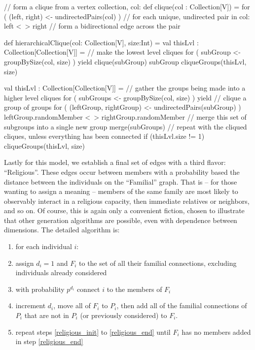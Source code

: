 \documentclass{article}
\begin{document}
\begin{code}[title=Pseudo-Code: Hierarchical Cliques]
// form a clique from a vertex collection, col:
def clique(col : Collection[V]) =
    for ( (left, right) <- undirectedPairs(col) ) // for each unique, undirected pair in col:
      left <~> right // form a bidirectional edge across the pair
      
def hierarchicalClique(col: Collection[V], size:Int) = 
   val thisLvl : Collection[Collection[V]] =
     // make the lowest level cliques 
     for ( subGroup <- groupBySize(col, size) ) yield {
       clique(subGroup)
       subGroup
     }
   cliqueGroups(thisLvl, size)
   
  val thisLvl : Collection[Collection[V]] =
    // gather the groups being made into a higher level cliques
    for ( subGroups <- groupBySize(col, size) ) yield {
      // clique a group of groups
      for ( (leftGroup, rightGroup) <- undirectedPairs(subGroup) ) {
        leftGroup.randomMember <~> rightGroup.randomMember
      }
      // merge this set of subgroups into a single new group
      merge(subGroups)
    }
  // repeat with the cliqued cliques, unless everything has been connected
  if (thisLvl.size != 1) cliqueGroups(thisLvl, size)  
\end{code}

Lastly for this model, we establish a final set of edges with a third flavor: ``Religious''.  These edges occur between members with a probability based the distance between the individuals on the ``Familial'' graph.  That is -- for those wanting to assign a meaning -- members of the same family are most likely to observably interact in a religious capacity, then immediate relatives or neighbors, and so on.  Of course, this is again only a convenient fiction, chosen to illustrate that other generation algorithms are possible, even with dependence between dimensions.  The detailed algorithm is:\begin{enumerate}
\item\label{religious_init} for each individual $i$:
\item assign $d_i=1$ and $F_i$ to the set of all their familial connections, excluding individuals already considered
\item with probability $p^{d_i}$ connect $i$ to the members of $F_i$
\item\label{religious_end} increment $d_i$, move all of $F_i$ to $P_i$, then add all of the familial connections of $P_i$ that are not in $P_i$ (or previously considered) to $F_i$.
\item repeat steps \ref{religious_init} to \ref{religious_end} until $F_i$ has no members added in step \ref{religious_end} 
\end{enumerate}
\end{document}
